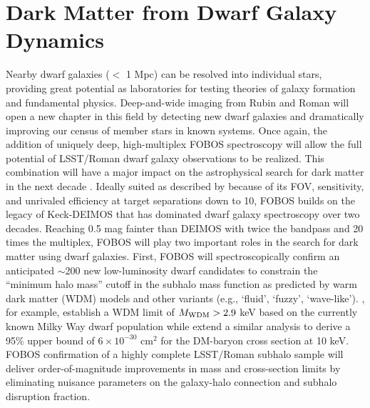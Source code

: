\documentclass[11pt,a4paper,twoside,onecolumn,openany,final,oldfontcommands]{memoir}
\begin{document}





\section{Dark Matter from Dwarf Galaxy Dynamics}

Nearby dwarf galaxies ($<$ 1 Mpc) can be resolved into individual stars, providing great potential as laboratories for testing theories of galaxy formation and fundamental physics.  Deep-and-wide imaging from Rubin and Roman will open a new chapter in this field by detecting new dwarf galaxies and dramatically improving our census of member stars in known systems.  Once again, the addition of uniquely deep, high-multiplex FOBOS spectroscopy will allow the full potential of LSST/Roman dwarf galaxy observations to be realized.  This combination will have a major impact on the astrophysical search for dark matter in the next decade \citep{drlica-wagner19}.  Ideally suited as described by \citet{simon19} because of its FOV, sensitivity, and unrivaled efficiency at target separations down to 10\arcsec, FOBOS builds on the legacy of Keck-DEIMOS that has dominated dwarf galaxy spectroscopy over two decades.  Reaching 0.5 mag fainter than DEIMOS with twice the bandpass and 20 times the multiplex, FOBOS will play two important roles in the search for dark matter using dwarf galaxies.  First, FOBOS will spectroscopically confirm an anticipated $\sim$200 new low-luminosity dwarf candidates to constrain the ``minimum halo mass'' cutoff in the subhalo mass function as predicted by warm dark matter (WDM) models and other variants (e.g., `fluid', `fuzzy', `wave-like').  \citet{jethwa18}, for example, establish a WDM limit of $M_{\rm WDM} > 2.9$ keV based on the currently known Milky Way dwarf population while \citet{nadler19} extend a similar analysis to derive a 95\% upper bound of $6 \times 10^{-30}$ cm$^2$ for the DM-baryon cross section at 10 keV.  FOBOS confirmation of a highly complete LSST/Roman subhalo sample will deliver order-of-magnitude improvements in mass and cross-section limits by eliminating nuisance parameters on the galaxy-halo connection and subhalo disruption fraction.
\end{document}

